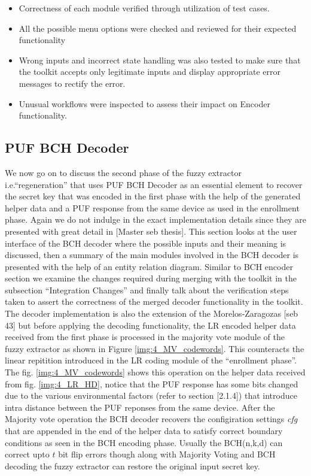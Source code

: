 \begin{itemize}
	\item Correctness of each module verified through utilization of test cases.
	\item All the possible menu options were checked and reviewed for their expected functionality
	\item Wrong inputs and incorrect state handling was also tested to make sure that the toolkit accepts only legitimate inputs and display appropriate error messages to rectify the error.
	\item Unusual workflows were inspected to assess their impact on Encoder functionality.
\end{itemize}

\subsection{PUF BCH Decoder}
We now go on to discuss the second phase of the fuzzy extractor i.e.``regeneration'' that uses PUF BCH Decoder as an essential element to recover the secret key that was encoded in the first phase with the help of the generated helper data and a PUF response from the same device as used in the enrollment phase. Again we do not indulge in the exact implementation details since they are presented with great detail in [Master seb thesis]. This section looks at the user interface of the BCH decoder where the possible inputs and their meaning is discussed, then a summary of the main modules involved in the BCH decoder
is presented with the help of an entity relation diagram. Similar to BCH encoder section we examine the changes required during merging with the toolkit in the subsection ``Integration Changes'' and finally talk about the verification steps taken to assert the correctness of the merged decoder functionality in the toolkit.\\

The decoder implementation is also the extension of the Morelos-Zaragozas [seb 43] but before applying the decoding functionality, the LR encoded helper data received from the first phase is processed in the majority vote module of the fuzzy extractor as shown in Figure \ref{img:4_MV_codewords}. This counteracts the linear repitition introduced in the LR coding module of the ``enrollment phase''. The fig. \ref{img:4_MV_codewords} shows this operation on the helper data received from fig. \ref{img:4_LR_HD}, notice that the PUF
response has some bits changed due to the various environmental factors (refer to section [2.1.4]) that introduce intra distance between the PUF reponses from the same device. After the Majority vote operation the BCH decoder recovers the configiration settings \emph{cfg} that are appended in the end of the helper data to satisfy correct boundary conditions as seen in the BCH encoding phase. Usually the BCH(n,k,d) can correct upto $t$ bit flip errors though along with Majority
Voting and BCH decoding the fuzzy extractor can restore the original input secret key.\\


